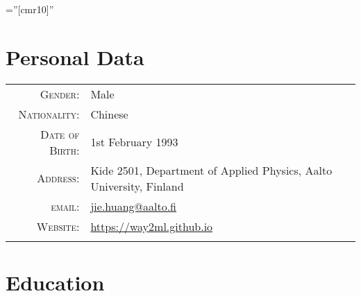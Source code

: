 \documentclass[a4paper,10pt]{article} %
\begin{document}
\font\fb=''[cmr10]'' %

\par{\bigskip\par} %

\section{Personal Data}

\begin{tabular}{rl}
\textsc{Gender:}                  	& Male \\
\textsc{Nationality:}               & Chinese \\
\textsc{Date of Birth:} 	        & 1st February 1993  \\
\textsc{Address:} 					& Kide 2501, Department of Applied Physics, Aalto University, Finland  \\
\textsc{email:} 					& 
\href{mailto:jie.huang@aalto.fi}{jie.huang@aalto.fi} \\
\textsc{Website:}                   & \href{https://way2ml.github.io}{https://way2ml.github.io}\\
\multicolumn{2}{c}{} \\	%
\end{tabular}



\section{Education}
\end{document}
